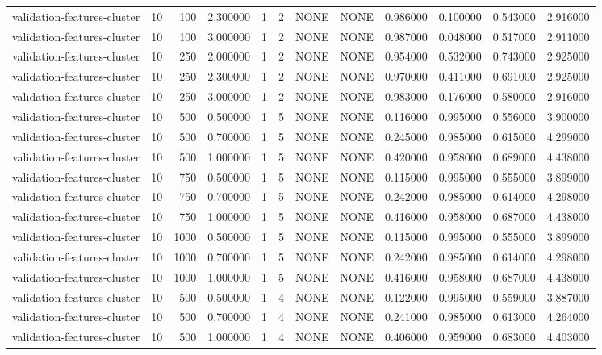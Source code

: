\begin{tabular}{lrrrllllrrrr}
validation-features-cluster & 10 & 100 & 2.300000 & 1 & 2 & NONE & NONE & 0.986000 & 0.100000 & 0.543000 & 2.916000 \\
validation-features-cluster & 10 & 100 & 3.000000 & 1 & 2 & NONE & NONE & 0.987000 & 0.048000 & 0.517000 & 2.911000 \\
validation-features-cluster & 10 & 250 & 2.000000 & 1 & 2 & NONE & NONE & 0.954000 & 0.532000 & 0.743000 & 2.925000 \\
validation-features-cluster & 10 & 250 & 2.300000 & 1 & 2 & NONE & NONE & 0.970000 & 0.411000 & 0.691000 & 2.925000 \\
validation-features-cluster & 10 & 250 & 3.000000 & 1 & 2 & NONE & NONE & 0.983000 & 0.176000 & 0.580000 & 2.916000 \\
validation-features-cluster & 10 & 500 & 0.500000 & 1 & 5 & NONE & NONE & 0.116000 & 0.995000 & 0.556000 & 3.900000 \\
validation-features-cluster & 10 & 500 & 0.700000 & 1 & 5 & NONE & NONE & 0.245000 & 0.985000 & 0.615000 & 4.299000 \\
validation-features-cluster & 10 & 500 & 1.000000 & 1 & 5 & NONE & NONE & 0.420000 & 0.958000 & 0.689000 & 4.438000 \\
validation-features-cluster & 10 & 750 & 0.500000 & 1 & 5 & NONE & NONE & 0.115000 & 0.995000 & 0.555000 & 3.899000 \\
validation-features-cluster & 10 & 750 & 0.700000 & 1 & 5 & NONE & NONE & 0.242000 & 0.985000 & 0.614000 & 4.298000 \\
validation-features-cluster & 10 & 750 & 1.000000 & 1 & 5 & NONE & NONE & 0.416000 & 0.958000 & 0.687000 & 4.438000 \\
validation-features-cluster & 10 & 1000 & 0.500000 & 1 & 5 & NONE & NONE & 0.115000 & 0.995000 & 0.555000 & 3.899000 \\
validation-features-cluster & 10 & 1000 & 0.700000 & 1 & 5 & NONE & NONE & 0.242000 & 0.985000 & 0.614000 & 4.298000 \\
validation-features-cluster & 10 & 1000 & 1.000000 & 1 & 5 & NONE & NONE & 0.416000 & 0.958000 & 0.687000 & 4.438000 \\
validation-features-cluster & 10 & 500 & 0.500000 & 1 & 4 & NONE & NONE & 0.122000 & 0.995000 & 0.559000 & 3.887000 \\
validation-features-cluster & 10 & 500 & 0.700000 & 1 & 4 & NONE & NONE & 0.241000 & 0.985000 & 0.613000 & 4.264000 \\
validation-features-cluster & 10 & 500 & 1.000000 & 1 & 4 & NONE & NONE & 0.406000 & 0.959000 & 0.683000 & 4.403000 \\

\end{tabular}
